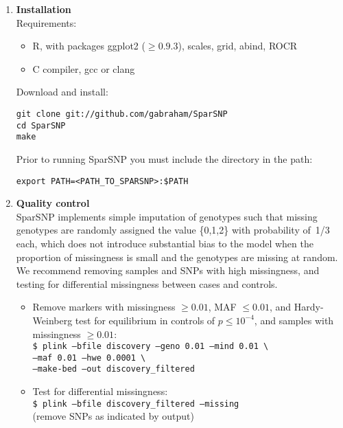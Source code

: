 \documentclass[a4paper,11pt]{article}
\begin{document}
\begin{enumerate}

   \item \textbf{Installation}\\

   Requirements:\\
   
      \begin{itemize}
	 \item \textsf{R}, with packages ggplot2 ($\ge 0.9.3$), scales, grid, abind, ROCR
	 \item C compiler, gcc or clang
      \end{itemize}

   Download and install:
\begin{verbatim}
git clone git://github.com/gabraham/SparSNP
cd SparSNP
make
\end{verbatim}

   Prior to running SparSNP you must include the directory in the path:
\begin{verbatim}
export PATH=<PATH_TO_SPARSNP>:$PATH
\end{verbatim}

   

   \item \textbf{Quality control}\\
      SparSNP implements simple imputation of genotypes such that missing
      genotypes are randomly assigned the value \{0,1,2\} with probability
      of~1/3 each, which does not introduce substantial bias to the model when
      the proportion of missingness is small and the genotypes are missing at
      random. We recommend removing samples and SNPs with high missingness,
      and testing for differential missingness between cases and controls.


      \begin{itemize}

      \item Remove markers with missingness $\ge 0.01$, MAF $\le 0.01$, and
      Hardy-Weinberg test for equilibrium in
      controls of $p\le 10^{-4}$, and samples with missingness $\ge 0.01$: \\
      \texttt{\$ plink --bfile discovery --geno 0.01 --mind 0.01
      \textbackslash \\ --maf 0.01 --hwe
      0.0001 \textbackslash \\
      --make-bed --out discovery\_filtered
      }

      \item Test for differential missingness: \\
      \texttt{\$ plink --bfile discovery\_filtered --missing} \\
      (remove SNPs as indicated by output)


\end{itemize}
\end{enumerate}
\end{document}
